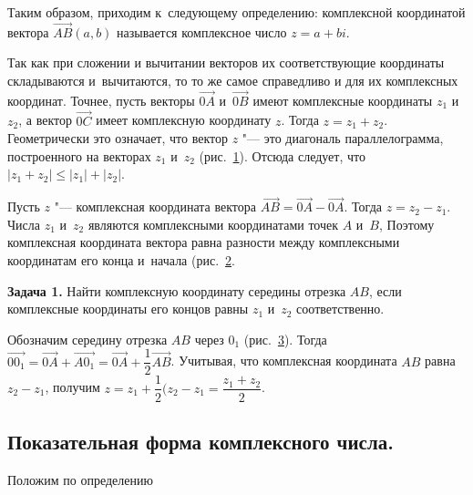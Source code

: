 Таким образом, приходим к~следующему определению: комплексной координатой вектора
$\overrightarrow{AB}(a, b)$ называется комплексное число $z = a + bi$.

Так как при сложении и вычитании векторов их соответствующие координаты складываются
и~вычитаются, то то же самое справедливо и для их комплексных координат.
Точнее, пусть векторы $\overrightarrow{0A}$ и~$\overrightarrow{0B}$ имеют комплексные координаты
$z_{1}$ и~$z_{2}$, а вектор $\overrightarrow{0C}$ имеет комплексную координату $z$.
Тогда $z = z_{1} + z_{2}$. Геометрически это означает, что вектор $z$ "--- это диагональ
параллелограмма, построенного на векторах $z_{1}$ и~$z_{2}$ (рис.\ \ref{fig:7_1_3}).
Отсюда следует, что $|z_{1} + z_{2}| \leqslant |z_{1}| + |z_{2}|$.

\begin{figure}\label{fig:7_1_3}
\end{figure}

Пусть $z$ "--- комплексная координата вектора
$\overrightarrow{AB} = \overrightarrow{0A} - \overrightarrow{0A}$. Тогда $z = z_{2} - z_{1}$.
Числа $z_{1}$ и~$z_{2}$ являются комплексными координатами точек $A$ и~$B$,
Поэтому комплексная координата вектора равна разности между комплексными координатам
его конца и~начала (рис.\ \ref{fig:7_1_4}.

\begin{figure}\label{fig:7_1_4}
\end{figure}

\textbf{Задача 1.}\label{ex:7_1_1} Найти комплексную координату середины отрезка $AB$,
если комплексные координаты его концов равны $z_{1}$ и~$z_{2}$ соответственно.

Обозначим середину отрезка $AB$ через $0_{1}$ (рис.\ \ref{fig:7_1_5}).
Тогда $\overrightarrow{00_{1}} = \overrightarrow{0A} + \overrightarrow{A0_{1}} =
\overrightarrow{0A} + \dfrac{1}{2}\overrightarrow{AB}$. Учитывая, что комплексная
координата $AB$ равна $z_{2} - z_{1}$, получим
$z = z_{1} + \dfrac{1}{2}(z_{2} - z_{1} = \dfrac{z_{1} + z_{2}}{2}$.

\begin{figure}\label{fig:7_1_5}
\end{figure}


\subsection{Показательная форма комплексного числа.}
Положим по определению

